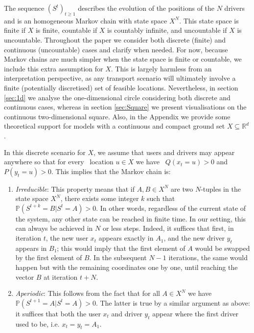 \documentclass[12pt,english]{article}
\begin{document}
The sequence $(S^t)_{t \geq 1}$ describes the evolution of the positions of the $N$ drivers and is an homogeneous Markov chain with state space $X^N$.  This state space is finite if $X$ is finite, countable if $X$ is countably infinite, and uncountable if $X$ is uncountable. Throughout the paper we consider both discrete (finite) and continuous (uncountable) cases and clarify when needed. For now, because Markov chains are much simpler when the state space is finite or countable, we include this extra assumption for $X$. This is largely harmless from an interpretation perspective, as any transport scenario will ultimately involve a finite  (potentially discretised) set of feasible locations. Nevertheless, in section \ref{sec:1d} we analyse the one-dimensional circle considering both discrete and continuous cases, whereas in section \ref{sec:Square} we present visualisations on the continuous two-dimensional square. Also, in the Appendix we provide some theoretical support for models with a continuous and compact ground set $X\subseteq\mathbb{R}^d$.

In this discrete scenario for $X$, we assume that users and drivers may appear anywhere so that for every \ location $u \in X$ we have \ $Q(x_t=u)>0$ and $P(y_t=u)>0$. 
This implies that the Markov chain is:
\begin{enumerate}
    \item \textit{Irreducible}: This property means that if $A,B\in X^N$ are two $N$-tuples in the state space $X^N$, there exists some integer $k$ such that $\mathbb{P}(S^{t+k}=B|S^t=A)>0$. In other words, regardless of the current state of the system, any other state can be reached in finite time. In our setting, this can always be achieved in $N$ or less steps. Indeed, it suffices that first, in iteration $t$, the new user $x_t$ appears exactly in $A_1$, and the new driver $y_t$ appears in $B_1$; this would imply that the first element of $A$ would be swapped by the first element of $B$. In the subsequent $N-1$ iterations, the same would happen but with the remaining coordinates one by one, until reaching the vector $B$ at iteration $t+N$.
    \item \textit{Aperiodic}: This follows from the fact that for all $A \in X^N$ we have $\mathbb{P}(S^{t+1}=A|S^t=A)>0$. The latter is true by a similar argument as above: it suffices that both the user $x_t$ and driver $y_t$ appear where the first driver used to be, i.e. $x_t=y_t=A_1$.
\end{enumerate}
\end{document}
